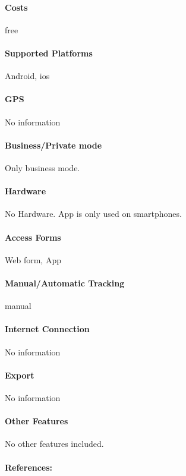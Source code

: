 \paragraph{Costs} free
\paragraph{Supported Platforms} Android, \gls{ios}
\paragraph{GPS} No information
\paragraph{Business/Private mode} Only business mode.
\paragraph{Hardware} No Hardware. App is only used on smartphones.
\paragraph{Access Forms}Web form, App
\paragraph{Manual/Automatic Tracking} manual
\paragraph{Internet Connection} No information
\paragraph{Export} No information
\paragraph{Other Features} No other features included.
\paragraph{References:} \cite{Trucker_Logbook}
\newpage

